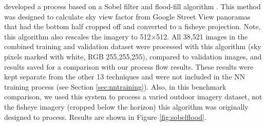 \documentclass[final,3p,times,authoryear]{elsarticle}
\begin{document}
\cite{Middel2018} developed a process based on a Sobel filter \citep{Sobel1968} and flood-fill algorithm \citep{Laungrungthip2008,Middel2017}. This method was designed to calculate sky view factor from Google Street View panoramas that had the bottom half cropped off and converted to a fisheye projection. Note, this algorithm also rescales the imagery to 512$\times$512. All 38,521 images in the combined training and validation dataset were processed with this algorithm (sky pixels marked with white, RGB 255,255,255), compared to validation images, and results saved for a comparison with our process flow results. These results were kept separate from the other 13 techniques and were not included in the NN training process (see Section \ref{sec:nntraining}). Also, in this benchmark comparison, we used this system to process a varied outdoor imagery dataset, not the fisheye imagery (cropped below the horizon) this algorithm was originally designed to process. Results are shown in Figure \ref{fig:sobelflood}.
\end{document}

